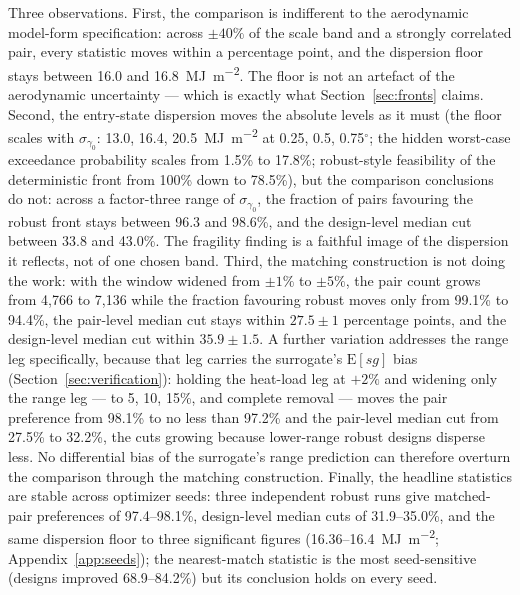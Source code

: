 Three observations. First, the comparison is indifferent to the
aerodynamic model-form specification: across $\pm40\%$ of the scale band
and a strongly correlated pair, every statistic moves within a percentage
point, and the dispersion floor stays between 16.0 and
\SI{16.8}{\mega\joule\per\square\metre}. The floor is not an artefact of
the aerodynamic uncertainty --- which is exactly what
Section~\ref{sec:fronts} claims. Second, the entry-state dispersion moves
the absolute levels as it must (the floor scales with
$\sigma_{\gamma_0}$: 13.0, 16.4, \SI{20.5}{\mega\joule\per\square\metre}
at 0.25, 0.5, 0.75$^\circ$; the hidden worst-case exceedance probability
scales from 1.5\% to 17.8\%; robust-style feasibility of the deterministic
front from 100\% down to 78.5\%), but the comparison conclusions do not:
across a factor-three range of $\sigma_{\gamma_0}$, the fraction of pairs
favouring the robust front stays between 96.3 and 98.6\%, and the
design-level median cut between 33.8 and 43.0\%. The fragility finding is
a faithful image of the dispersion it reflects, not of one chosen band.
Third, the matching construction is not doing the work: with the window
widened from $\pm1\%$ to $\pm5\%$, the pair count grows from 4{,}766 to
7{,}136 while the fraction favouring robust moves only from 99.1\% to
94.4\%, the pair-level median cut stays within $27.5\pm1$ percentage
points, and the design-level median cut within $35.9\pm1.5$. A further
variation addresses the range leg specifically, because that leg carries
the surrogate's $\mathrm{E}[sg]$ bias (Section~\ref{sec:verification}):
holding the heat-load leg at $+2\%$ and widening only the range leg ---
to 5, 10, 15\%, and complete removal --- moves the pair preference from
98.1\% to no less than 97.2\% and the pair-level median cut from 27.5\%
to 32.2\%, the cuts growing because lower-range robust designs disperse
less. No differential bias of the surrogate's range prediction can
therefore overturn the comparison through the matching construction.
Finally, the
headline statistics are stable across optimizer seeds: three independent
robust runs give matched-pair preferences of 97.4--98.1\%, design-level
median cuts of 31.9--35.0\%, and the same dispersion floor to three
significant figures (16.36--\SI{16.4}{\mega\joule\per\square\metre};
Appendix~\ref{app:seeds}); the nearest-match statistic is the most
seed-sensitive (designs improved 68.9--84.2\%) but its conclusion holds
on every seed.

